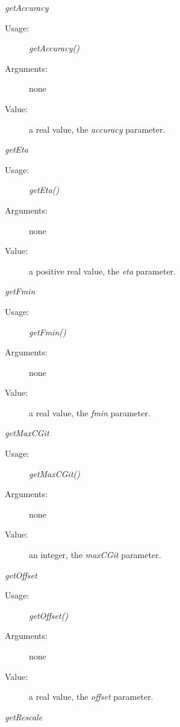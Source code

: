 \begin{description}
\item[Some methods:]  \rule{0pt}{1em}

  \begin{description}

  \item \textit{getAccuracy}
    \begin{description}
    \item[Usage:] \textit{getAccuracy()}
    \item[Arguments:] none
    \item[Value:]  a real value, the \textit{accuracy} parameter.
    \end{description}
    \bigskip
  \item \textit{getEta}
    \begin{description}
    \item[Usage:] \textit{getEta()}
    \item[Arguments:] none
    \item[Value:]  a positive real value, the \textit{eta} parameter.
    \end{description}
    \bigskip
  \item \textit{getFmin}
    \begin{description}
    \item[Usage:] \textit{getFmin()}
    \item[Arguments:] none
    \item[Value:]  a real value, the \textit{fmin} parameter.
    \end{description}
    \bigskip
  \item \textit{getMaxCGit}
    \begin{description}
    \item[Usage:] \textit{getMaxCGit()}
    \item[Arguments:] none
    \item[Value:]  an integer, the \textit{maxCGit} parameter.
    \end{description}
    \bigskip
  \item \textit{getOffset}
    \begin{description}
    \item[Usage:] \textit{getOffset()}
    \item[Arguments:] none
    \item[Value:]  a real value, the \textit{offset} parameter.
    \end{description}
    \bigskip
  \item \textit{getRescale}
    \begin{description}

\end{description}
\end{description}
\end{description}
